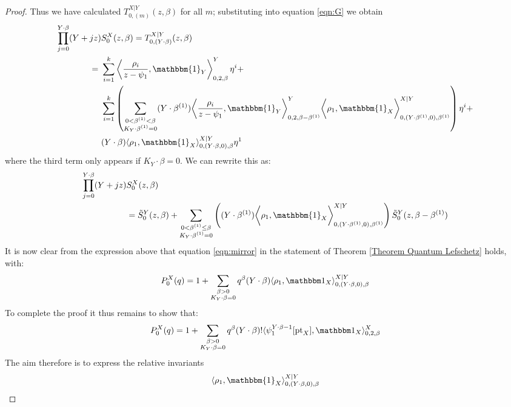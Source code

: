 \documentclass[11pt]{amsart}
\newcommand{\pt}{\operatorname{pt}}
\theoremstyle{definition}
\theoremstyle{definition}
\begin{document}
\begin{proof}
Thus we have calculated $T_{0,(m)}^{X|Y}(z,\beta)$ for all $m$; substituting into equation \eqref{eqn:G} we obtain
\begin{align*} \prod_{j=0}^{Y \cdot \beta} (Y + jz) & S_0^X(z,\beta) = T_{0,(Y\cdot\beta)}^{X|Y}(z,\beta) \\
= \ & \sum_{i=1}^k \left\langle \dfrac{\rho_i}{z-\psi_1}, \mathbbm{1}_Y \right\rangle_{0,2,\beta}^Y \eta^i + \\
& \sum_{i=1}^k \left( \sum_{\substack{0 < \beta^{(1)} < \beta \\ K_Y \cdot \beta^{(1)}=0}} (Y \cdot \beta^{(1)}) \bigg\langle \dfrac{\rho_i}{z-\psi_1}, \mathbbm{1}_Y \bigg\rangle_{0,2,\beta-\beta^{(1)}}^Y \bigg\langle \rho_1, \mathbbm{1}_X \bigg\rangle_{0,(Y \cdot \beta^{(1)},0),\beta^{(1)}}^{X|Y} \right) \eta^i + \\
& (Y \cdot \beta) \langle \rho_1 , \mathbbm{1}_X \rangle_{0,(Y \cdot \beta,0),\beta}^{X|Y} \eta^1
\end{align*}
where the third term only appears if $K_Y \cdot \beta=0$. We can rewrite this as:
\begin{align*} \prod_{j=0}^{Y \cdot \beta} (Y + jz) & S_0^X(z,\beta) \\
& = \tilde{S}_0^Y(z,\beta) + \sum_{\substack{0 < \beta^{(1)} \leq \beta \\ K_Y \cdot \beta^{(1)}=0}} \left( (Y \cdot \beta^{(1)}) \bigg\langle \rho_1, \mathbbm{1}_X \bigg\rangle_{0,(Y \cdot \beta^{(1)},0),\beta^{(1)}}^{X|Y} \right) \tilde{S}_0^Y(z,\beta-\beta^{(1)})
\end{align*}
It is now clear from the expression above that equation \eqref{eqn:mirror} in the statement of Theorem \ref{Theorem Quantum Lefschetz} holds, with:
\begin{equation*} P_0^X(q) = 1 + \sum_{\substack{\beta>0 \\ K_Y\cdot\beta=0}} q^\beta (Y\cdot\beta) \langle \rho_1,\mathbbm 1_{X}\rangle_{0,(Y\cdot\beta,0),\beta}^{X|Y} \end{equation*}
To complete the proof it thus remains to show that:
\begin{equation*} P_0^X(q) = 1 + \sum_{\substack{\beta>0 \\ K_Y\cdot\beta=0}} q^\beta(Y\cdot\beta)!\langle\psi_1^{Y\cdot\beta-1} [\pt_X],\mathbbm 1_{X}\rangle_{0,2,\beta}^X \end{equation*}
The aim therefore is to express the relative invariants
\begin{equation*} \langle \rho_1 , \mathbbm{1}_X \rangle_{0,(Y\cdot\beta,0),\beta}^{X|Y} \end{equation*}

\end{proof}
\end{document}
